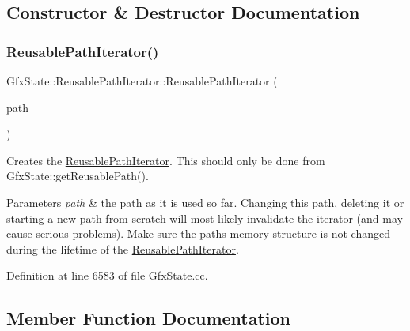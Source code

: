 \subsection{Constructor \& Destructor Documentation}
\mbox{\label{class_gfx_state_1_1_reusable_path_iterator_a5684cb7996f4e5d90618e82a508547ab}} 
\subsubsection{\texorpdfstring{Reusable\+Path\+Iterator()}{ReusablePathIterator()}}
{\footnotesize\ttfamily Gfx\+State\+::\+Reusable\+Path\+Iterator\+::\+Reusable\+Path\+Iterator (\begin{DoxyParamCaption}\item[{\hyperlink{class_gfx_path}{Gfx\+Path} $\ast$}]{path }\end{DoxyParamCaption})}

Creates the \hyperlink{class_gfx_state_1_1_reusable_path_iterator}{Reusable\+Path\+Iterator}. This should only be done from Gfx\+State\+::get\+Reusable\+Path().


\begin{DoxyParams}{Parameters}
{\em path} & the path as it is used so far. Changing this path, deleting it or starting a new path from scratch will most likely invalidate the iterator (and may cause serious problems). Make sure the path\textquotesingle{}s memory structure is not changed during the lifetime of the \hyperlink{class_gfx_state_1_1_reusable_path_iterator}{Reusable\+Path\+Iterator}. \\
\hline
\end{DoxyParams}


Definition at line 6583 of file Gfx\+State.\+cc.



\subsection{Member Function Documentation}
\mbox{\label{class_gfx_state_1_1_reusable_path_iterator_a044ed0b09dfce40f703700db98c6e1d9}} 
